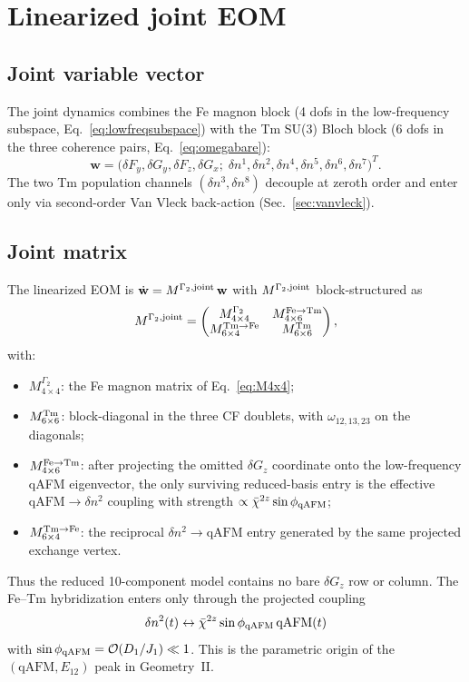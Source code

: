 \documentclass[reprint,amsmath,amssymb,aps,prb,longbibliography]{revtex4-2}
\begin{document}
\section{Linearized joint EOM}
\label{sec:linEOM}

\subsection{Joint variable vector}
The joint dynamics combines the Fe magnon block (4 dofs in the
low-frequency subspace, Eq.~\eqref{eq:lowfreqsubspace}) with the Tm SU(3)
Bloch block (6 dofs in the three coherence pairs, Eq.~\eqref{eq:omegabare}):
\begin{equation}
\mathbf w = \bigl(\delta F_y, \delta G_y, \delta F_z, \delta G_x;\;
\delta n^1, \delta n^2, \delta n^4, \delta n^5, \delta n^6, \delta n^7\bigr)^T.
\label{eq:wjoint}
\end{equation}
The two Tm population channels $(\delta n^3, \delta n^8)$ decouple at
zeroth order and enter only via second-order Van Vleck back-action
(Sec.~\ref{sec:vanvleck}).

\subsection{Joint matrix}
The linearized EOM is $\dot{\mathbf w} = M^{\Gamma_2,{\rm joint}}\,\mathbf w$
with $M^{\Gamma_2,{\rm joint}}$ block-structured as
\begin{equation}
M^{\Gamma_2,{\rm joint}} = \begin{pmatrix}
M^{\Gamma_2}_{4\times 4} & M^{\rm Fe\to Tm}_{4\times 6} \\
M^{\rm Tm\to Fe}_{6\times 4} & M^{\rm Tm}_{6\times 6}
\end{pmatrix},
\label{eq:Mjoint}
\end{equation}
with:
\begin{itemize}[leftmargin=*]
\item $M^{\Gamma_2}_{4\times 4}$: the Fe magnon matrix of Eq.~\eqref{eq:M4x4};
\item $M^{\rm Tm}_{6\times 6}$: block-diagonal in the three CF doublets,
with $\omega_{12,13,23}$ on the diagonals;
\item $M^{\rm Fe\to Tm}_{4\times 6}$: after projecting the omitted
$\delta G_z$ coordinate onto the low-frequency qAFM eigenvector, the only
surviving reduced-basis entry is the effective
$\mathrm{qAFM}\to\delta n^2$ coupling with strength
$\propto\bar\chi^{2z}\sin\phi_{\rm qAFM}$;
\item $M^{\rm Tm\to Fe}_{6\times 4}$: the reciprocal
$\delta n^2\to\mathrm{qAFM}$ entry generated by the same projected
exchange vertex.
\end{itemize}
Thus the reduced 10-component model contains no bare $\delta G_z$ row or
column. The Fe--Tm hybridization enters only through the projected
coupling
\begin{equation}
\delta n^2(t)\leftrightarrow \bar\chi^{2z}\sin\phi_{\rm qAFM}\,\mathrm{qAFM}(t)
\label{eq:n2qAFM}
\end{equation}
with $\sin\phi_{\rm qAFM}=\mathcal O(D_1/J_1)\ll 1$. This is the
parametric origin of the $(\mathrm{qAFM}, E_{12})$ peak in Geometry~II.
\end{document}
